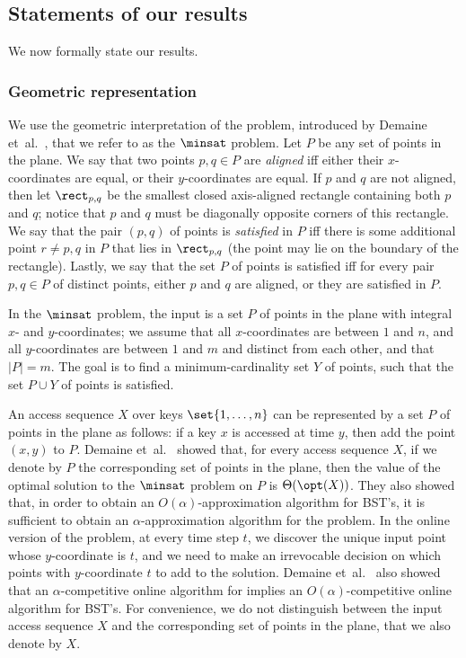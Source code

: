 \documentclass[11pt]{article}
\numberwithin{equation}{section}
\theoremstyle{definition}
\theoremstyle{plain}
\begin{document}
\subsection{Statements of our results}

We now formally state our results.

\subsubsection{Geometric representation} 

%



 
We use the geometric interpretation of the
problem, introduced by Demaine et~al.~\cite{DHIKP09}, that we refer to as the $\minsat$ problem. 
Let $P$ be any set of points in the plane. We say that two points $p,q\in P$ are \emph{aligned} iff either their $x$-coordinates are equal, or their $y$-coordinates are equal. If $p$ and $q$ are not aligned, then  let $\rect_{p,q}$ be the smallest closed axis-aligned rectangle containing both $p$ and $q$; notice that $p$ and $q$ must be diagonally opposite corners of this rectangle. We say that the pair $(p,q)$ of points is \emph{satisfied} in $P$ iff there is some additional point $r\neq p,q$ in $P$ that lies in $\rect_{p,q}$ (the point may lie on the boundary of the rectangle).
Lastly, we say that the set $P$ of points is satisfied iff for every pair $p,q\in P$ of distinct points, either $p$ and $q$ are aligned, or they are satisfied in $P$.

In the $\minsat$ problem, the input is a set $P$ of points in the plane with integral $x$- and $y$-coordinates; we assume that all $x$-coordinates are between $1$ and $n$, and all $y$-coordinates are between $1$ and $m$ and distinct from each other, and that $|P|=m$. The goal is to find a minimum-cardinality set $Y$ of points, such that the set $P\cup Y$ of points is satisfied.

An access sequence $X$ over keys $\set{1,\ldots,n}$ can be represented by a set $P$ of points in the plane as follows:
if a key $x$ is accessed at time $y$, then add the point $(x,y)$ to $P$.
Demaine et~al.~\cite{DHIKP09} showed that, for every access sequence $X$, if we denote by $P$ the corresponding set of points in the plane, then the value of the optimal solution to the $\minsat$ problem on $P$ is $\Theta(\opt(X))$. They also showed that, in order to obtain an $O(\alpha)$-approximation algorithm for BST's, it is sufficient to obtain an $\alpha$-approximation algorithm for the \minsat problem. In the online version of the \minsat problem, at every time step $t$, we discover the unique input point whose $y$-coordinate is $t$, and we need to make an irrevocable decision on which points with $y$-coordinate $t$ to add to the solution. Demaine et~al.~\cite{DHIKP09} also showed that an $\alpha$-competitive online algorithm for \minsat implies an $O(\alpha)$-competitive online algorithm for BST's.
For convenience, we do not distinguish between the input access sequence $X$ and the corresponding set of points in the plane, that we also denote by $X$.
\end{document}
